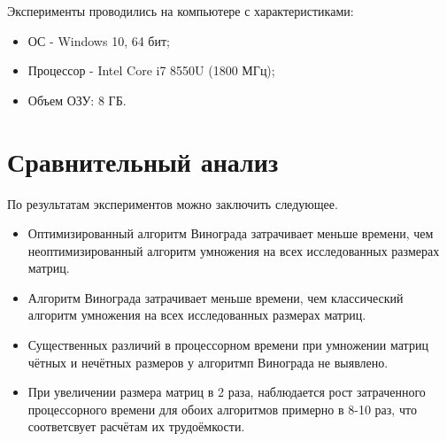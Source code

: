 Эксперименты проводились на компьютере с характеристиками:
\begin{itemize}
	\item ОС - Windows 10, 64 бит;
	\item Процессор -  Intel Core i7 8550U (1800 МГц);
	\item Объем ОЗУ: 8 ГБ.
\end{itemize}

\section{Сравнительный анализ}
По результатам экспериментов можно заключить следующее.
\begin{itemize}
	\item Оптимизированный алгоритм Винограда затрачивает меньше времени, чем неоптимизированный алгоритм умножения на всех исследованных размерах матриц.
	\item Алгоритм Винограда затрачивает меньше времени, чем классический алгоритм умножения на всех исследованных размерах матриц.
	\item Существенных различий в процессорном времени при умножении матриц чётных и нечётных размеров у алгоритмп Винограда не выявлено.
	\item При увеличении размера матриц в 2 раза, наблюдается рост затраченного процессорного времени для обоих алгоритмов примерно в 8-10 раз, что соответсвует расчётам их трудоёмкости.
\end{itemize}


	